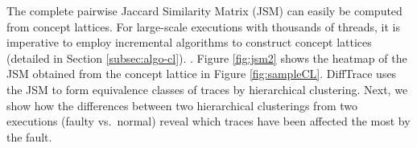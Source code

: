 % 
%

The complete pairwise Jaccard Similarity Matrix (JSM) can easily be computed from concept lattices.
%
For large-scale executions with thousands of threads, it is imperative
to employ incremental algorithms to
construct concept lattices (detailed in Section \ref{subsec:algo-cl}).
.
%
%
Figure \ref{fig:jsm2}
shows the heatmap
of the JSM obtained from the concept lattice in Figure \ref{fig:sampleCL}.
%
DiffTrace uses the JSM to form equivalence classes of traces by hierarchical clustering.
%
Next, we show how the differences between two hierarchical clusterings from two executions
(faulty vs.~normal) reveal which traces have been affected the most by the fault.


